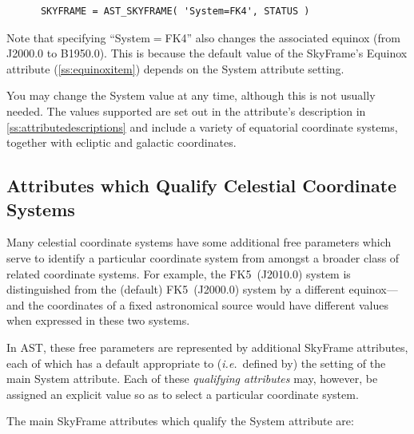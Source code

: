 \documentclass[twoside,11pt]{article}
\newcommand{\htmlref}[2]{#1}
\newcommand{\appref}[1]{Appendix~\ref{#1}}
\newcommand{\secref}[1]{\S\ref{#1}}
\renewcommand{\appref}[1]{\ref{#1}}
\renewcommand{\secref}[1]{\ref{#1}}
\begin{document}
\small
\begin{verbatim}
      SKYFRAME = AST_SKYFRAME( 'System=FK4', STATUS )
\end{verbatim}
\normalsize

Note that specifying ``System$=$FK4'' also changes the associated
equinox (from J2000.0 to B1950.0). This is because the default value
of the SkyFrame's \htmlref{Equinox}{Equinox} attribute (\secref{ss:equinoxitem}) depends
on the System attribute setting.

You may change the System value at any time, although this is not
usually needed.  The values supported are set out in the attribute's
description in \appref{ss:attributedescriptions} and include a variety
of equatorial coordinate systems, together with ecliptic and galactic
coordinates.

\subsection{Attributes which Qualify Celestial Coordinate Systems}

Many celestial coordinate systems have some additional free parameters
which serve to identify a particular coordinate system from amongst a
broader class of related coordinate systems. For example, the
FK5~(J2010.0) system is distinguished from the (default) FK5~(J2000.0)
system by a different equinox---and the coordinates of a fixed
astronomical source would have different values when expressed in
these two systems.

In AST, these free parameters are represented by additional \htmlref{SkyFrame}{SkyFrame}
attributes, each of which has a default appropriate to
({\em{i.e.}}\ defined by) the setting of the main \htmlref{System}{System}
attribute. Each of these {\em{qualifying attributes}} may, however, be
assigned an explicit value so as to select a particular coordinate
system.

The main SkyFrame attributes which qualify the System attribute are:
\end{document}
